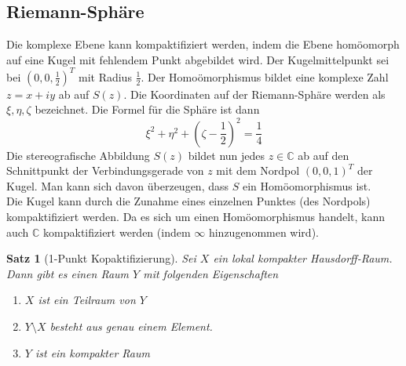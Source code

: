 \documentclass[a4paper, 12pt]{article}
\theoremstyle{plain}
\newtheorem{theorem}{Satz}[section] %
\theoremstyle{definition}
\theoremstyle{lemma}
\theoremstyle{remark}
\theoremstyle{corollary}
\theoremstyle{example}
\begin{document}
	\subsection{Riemann-Sphäre}
	Die komplexe Ebene kann kompaktifiziert werden, indem die Ebene homöomorph auf eine Kugel mit fehlendem Punkt abgebildet wird. Der Kugelmittelpunkt sei bei $(0,0,\frac{1}{2})^T$ mit Radius $\frac{1}{2}$. Der Homoömorphismus bildet eine komplexe Zahl $z=x+iy$ ab auf $S(z)$. Die Koordinaten auf der Riemann-Sphäre werden als $\xi,\eta,\zeta$ bezeichnet. Die Formel für die Sphäre ist dann \[\xi^2+\eta^2+(\zeta-\frac{1}{2})^2 = \frac{1}{4}\]
	Die stereografische Abbildung $S(z)$ bildet nun jedes $z\in\mathbb{C}$ ab auf den Schnittpunkt der Verbindungsgerade von $z$ mit dem Nordpol $(0,0,1)^T$ der Kugel. Man kann sich davon überzeugen, dass $S$ ein Homöomorphismus ist.\\
	Die Kugel kann durch die Zunahme eines einzelnen Punktes (des Nordpols) kompaktifiziert werden. Da es sich um einen Homöomorphismus handelt, kann auch $\mathbb{C}$ kompaktifiziert werden (indem $\infty$ hinzugenommen wird).
	\begin{theorem}[1-Punkt Kopaktifizierung]
		Sei $X$ ein lokal kompakter Hausdorff-Raum. Dann gibt es einen Raum $Y$ mit folgenden Eigenschaften \begin{enumerate}
			\item $X$ ist ein Teilraum von $Y$
			\item $Y\setminus X$ besteht aus genau einem Element.
			\item $Y$ ist ein kompakter Raum
		\end{enumerate}
	\end{theorem}
\end{document}
